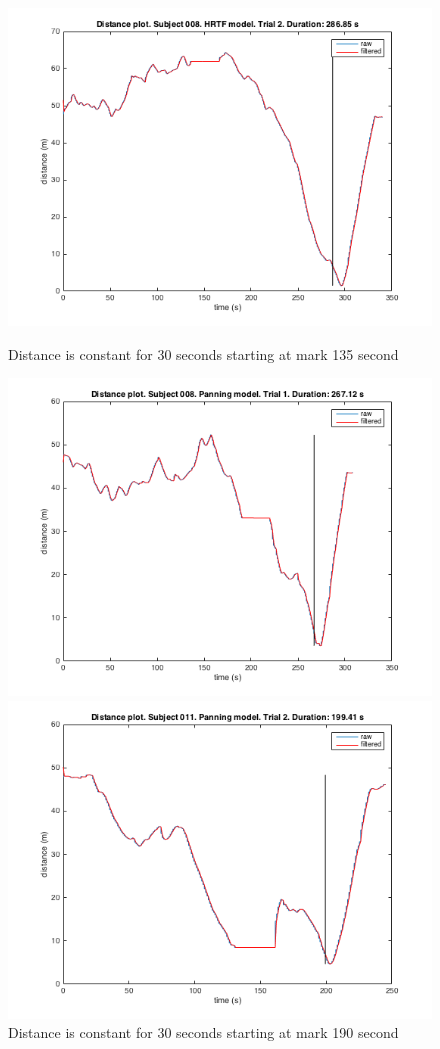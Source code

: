\documentclass[journal]{IEEEtran}
\begin{document}
\begin{appendices}
\begin{figure}[h!]
  \centering
    \includegraphics[scale=0.45]{graphics/subject008htrftrial2.png}
  \caption{Distance is constant for 30 seconds starting at mark 135 second}
    \label{fig:plt3}
      \includegraphics[scale=0.45]{graphics/subject008panningtrial1.png}
  \caption{Distance is constant for 30 seconds starting at mark 190 second}
    \label{fig:plt4}
      \includegraphics[scale=0.45]{graphics/subject011panningtrial2.png}

\end{figure}
\end{appendices}
\end{document}
